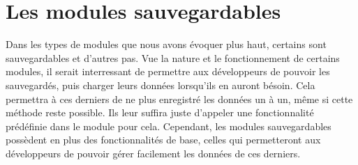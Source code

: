 \documentclass[a4paper, 11pt]{article}
\begin{document}
	\section{Les modules sauvegardables}
	Dans les types de modules que nous avons évoquer plus haut, certains sont sauvegardables et d'autres 
	pas. Vue la nature et le fonctionnement de certains modules, il serait interressant de permettre aux
	développeurs de pouvoir les sauvegardés, puis charger leurs données lorsqu'ils en auront bésoin. Cela
	permettra à ces derniers de ne plus enregistré les données un à un, même si cette méthode reste 
	possible. Ils leur suffira juste d'appeler une fonctionnalité prédéfinie dans le module pour cela. 
	Cependant, les modules sauvegardables possèdent en plus des fonctionnalités de base, celles qui 
	permetteront aux développeurs de pouvoir gérer facilement les données de ces derniers.
\end{document}
